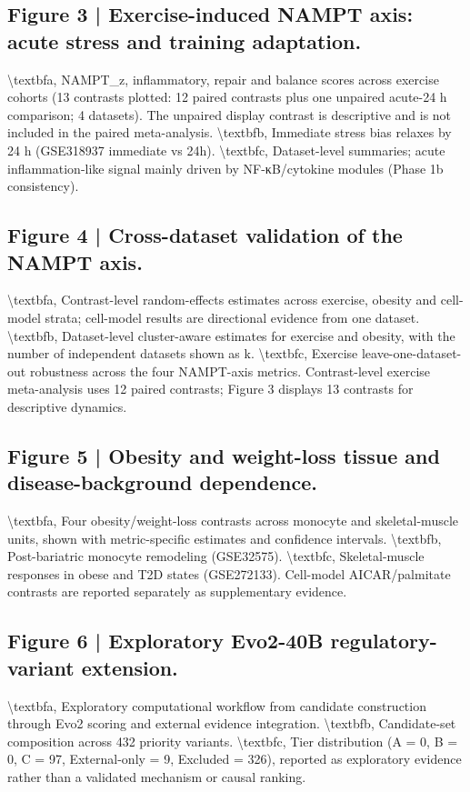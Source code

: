\documentclass[11pt]{article}
\begin{document}
\subsection*{Figure 3 | Exercise-induced NAMPT axis: acute stress and training adaptation.}
\textbackslash{}textbf{a}, NAMPT\_z, inflammatory, repair and balance scores across exercise cohorts (13 contrasts plotted: 12 paired contrasts plus one unpaired acute-24 h comparison; 4 datasets). The unpaired display contrast is descriptive and is not included in the paired meta-analysis. \textbackslash{}textbf{b}, Immediate stress bias relaxes by 24 h (GSE318937 immediate vs 24h). \textbackslash{}textbf{c}, Dataset-level summaries; acute inflammation-like signal mainly driven by NF-κB/cytokine modules (Phase 1b consistency).

\subsection*{Figure 4 | Cross-dataset validation of the NAMPT axis.}
\textbackslash{}textbf{a}, Contrast-level random-effects estimates across exercise, obesity and cell-model strata; cell-model results are directional evidence from one dataset. \textbackslash{}textbf{b}, Dataset-level cluster-aware estimates for exercise and obesity, with the number of independent datasets shown as k. \textbackslash{}textbf{c}, Exercise leave-one-dataset-out robustness across the four NAMPT-axis metrics. Contrast-level exercise meta-analysis uses 12 paired contrasts; Figure 3 displays 13 contrasts for descriptive dynamics.

\subsection*{Figure 5 | Obesity and weight-loss tissue and disease-background dependence.}
\textbackslash{}textbf{a}, Four obesity/weight-loss contrasts across monocyte and skeletal-muscle units, shown with metric-specific estimates and confidence intervals. \textbackslash{}textbf{b}, Post-bariatric monocyte remodeling (GSE32575). \textbackslash{}textbf{c}, Skeletal-muscle responses in obese and T2D states (GSE272133). Cell-model AICAR/palmitate contrasts are reported separately as supplementary evidence.

\subsection*{Figure 6 | Exploratory Evo2-40B regulatory-variant extension.}
\textbackslash{}textbf{a}, Exploratory computational workflow from candidate construction through Evo2 scoring and external evidence integration. \textbackslash{}textbf{b}, Candidate-set composition across 432 priority variants. \textbackslash{}textbf{c}, Tier distribution (A = 0, B = 0, C = 97, External-only = 9, Excluded = 326), reported as exploratory evidence rather than a validated mechanism or causal ranking.
\end{document}
